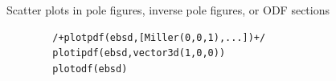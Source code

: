 \begin{frame}[fragile]
\begin{columns}
\begin{column}{8.5cm}
\medskip

\pause

Scatter plots in pole figures, inverse pole figures, or ODF sections
\begin{lstlisting}
		/+plotpdf(ebsd,[Miller(0,0,1),...])+/
		plotipdf(ebsd,vector3d(1,0,0))
		plotodf(ebsd)
\end{lstlisting}

    \end{column}

    \begin{column}{3.5cm}
\end{column}
\end{columns}
\end{frame}
